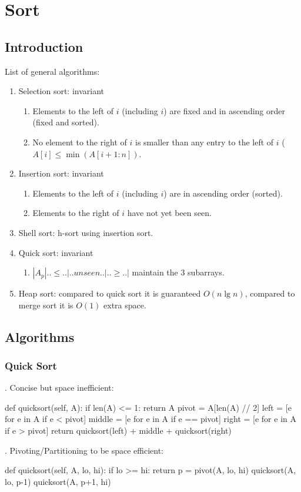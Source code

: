 \chapter{Sort}


\section{Introduction}
List of general algorithms:
\begin{enumerate}
\item Selection sort: invariant
\begin{enumerate}
\item Elements to the left of $i$ (including $i$) are fixed and in ascending order (fixed and sorted).
\item No element to the right of $i$ is smaller than any entry to the left of $i$ ($A[i]  \leq\min(A[i+1:n])$.
\end{enumerate}
\item Insertion sort: invariant
\begin{enumerate}
\item Elements to the left of $i$ (including $i$) are in ascending order (sorted).
\item Elements to the right of $i$ have not yet been seen.
\end{enumerate}
\item Shell sort: h-sort using insertion sort.
\item Quick sort: invariant
\begin{enumerate}
\item $|A_p|..\leq..|..unseen..|..\geq..|$ maintain the 3 subarrays.
\end{enumerate}
\item Heap sort: compared to quick sort it is guaranteed $O(n \lg n)$, compared to merge sort it is $O(1)$ extra space. 
\end{enumerate}

\section{Algorithms}
\subsection{Quick Sort}
. Concise but space inefficient: 
\begin{python}
def quicksort(self, A):
    if len(A) <= 1:
        return A
    pivot = A[len(A) // 2]
    left = [e for e in A if e < pivot]
    middle = [e for e in A if e == pivot]
    right = [e for e in A if e > pivot]
    return quicksort(left) + middle + quicksort(right)
\end{python}
. Pivoting/Partitioning to be space efficient:
\begin{python}
def quicksort(self, A, lo, hi):
    if lo >= hi:
        return
    p = pivot(A, lo, hi)
    quicksort(A, lo, p-1)
    quicksort(A, p+1, hi)
\end{python}

